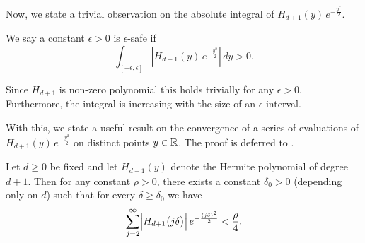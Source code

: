 Now, we state a trivial observation on the absolute integral of $H_{d+1}\left( y \right) \, e^{ -\frac{y^2}{2} }$. 
\begin{assumption}\label{ass: safe}
    We say a constant $\epsilon > 0$ is $\epsilon$-safe if $$\int_{[-\epsilon,\epsilon]} \left| H_{d+1}\left( y \right) \, e^{ -\frac{y^2}{2} }\right| \, dy > 0.$$
\end{assumption}
Since $H_{d+1}$ is non-zero polynomial this holds trivially for any $\epsilon > 0$. Furthermore, the integral is increasing with the size of an $\epsilon$-interval. 

With this, we state a useful result on the convergence of a series of evaluations of $H_{d+1}\left( y \right) \, e^{ -\frac{y^2}{2}}$ on distinct points $y \in \mathbb{R}$. The proof is deferred to \iftoggle{longversion}{\appref{app: useful}}{the supplemental materials}.



\begin{lemma}\label{lem: inter}
Let \( d\ge 0 \) be fixed and let \( H_{d+1}(y) \) denote the Hermite polynomial of degree \( d+1 \). Then for any constant $\rho > 0$, there exists a constant \( \delta_0 > 0 \) (depending only on \( d \)) such that for every \(\delta \ge \delta_0\) we have
\[
\sum_{j=2}^\infty \Bigl| H_{d+1}\bigl(j\delta\bigr) \Bigr|\, e^{-\frac{(j\delta)^2}{2}} < \frac{\rho}{4}.
\]
\end{lemma}


